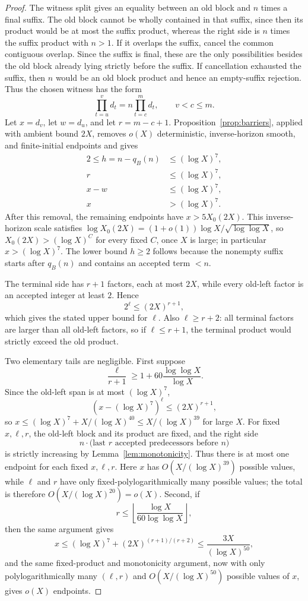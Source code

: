 \documentclass[11pt]{article}
\theoremstyle{definition}
\newcommand{\floor}[1]{\left\lfloor #1\right\rfloor}
\newcommand{\1}{\mathbf 1}
\begin{document}
\begin{proof}
The witness split gives an equality between an old block and \(n\) times a
final suffix.  The old block cannot be wholly contained in that suffix, since
then its product would be at most the suffix product, whereas the right side is
\(n\) times the suffix product with \(n>1\).  If it overlaps the suffix,
cancel the common contiguous overlap.  Since the suffix is final, these are
the only possibilities besides the old block already lying strictly before
the suffix.  If cancellation exhausted the suffix, then \(n\) would be an old
block product and hence an empty-suffix rejection.  Thus the chosen witness has
the form
\[
  \prod_{t=u}^{v} d_t
  = n\prod_{t=c}^{m} d_t,\qquad v<c\le m.
\]
Let \(x=d_v\), let \(w=d_u\), and let \(r=m-c+1\).  Proposition~\ref{prop:barriers},
applied with ambient bound \(2X\), removes \(o(X)\) deterministic,
inverse-horizon smooth, and finite-initial endpoints and gives
\begin{align*}
  2\le h=n-q_B(n)&\le(\log X)^7,\\
  r&\le(\log X)^7,\\
  x-w&\le(\log X)^7,\\
  x&>(\log X)^7.
\end{align*}
After this removal, the remaining endpoints have \(x>5X_0(2X)\).  This
inverse-horizon scale satisfies
\(\log X_0(2X)=(1+o(1))\log X/\sqrt{\log\log X}\), so
\(X_0(2X)>(\log X)^C\) for every fixed \(C\), once \(X\) is large; in
particular \(x>(\log X)^7\).
The lower bound \(h\ge2\) follows because the nonempty suffix starts after
\(q_B(n)\) and contains an accepted term \(<n\).

The terminal side has \(r+1\) factors, each at most \(2X\), while every
old-left factor is an accepted integer at least \(2\).  Hence
\[
  2^\ell\le (2X)^{r+1},
\]
which gives the stated upper bound for \(\ell\).  Also \(\ell\ge r+2\):
all terminal factors are larger than all old-left factors, so if
\(\ell\le r+1\), the terminal product would strictly exceed the old product.

Two elementary tails are negligible.  First suppose
\[
  \frac{\ell}{r+1}\ge 1+60\frac{\log\log X}{\log X}.
\]
Since the old-left span is at most \((\log X)^7\),
\[
  (x-(\log X)^7)^\ell\le(2X)^{r+1},
\]
so \(x\le(\log X)^7+X/(\log X)^{40}\le X/(\log X)^{39}\) for large \(X\).
For fixed \(x,\ell,r\), the
old-left block and its product are fixed, and the right side
\[
  n\cdot\text{(last \(r\) accepted predecessors before \(n\))}
\]
is strictly increasing by Lemma~\ref{lem:monotonicity}.  Thus there is at
most one endpoint for each fixed \(x,\ell,r\).  Here \(x\) has
\(O(X/(\log X)^{39})\) possible values, while \(\ell\) and \(r\) have only
fixed-polylogarithmically many possible values; the total is therefore
\(O(X/(\log X)^{20})=o(X)\).  Second, if
\[
  r\le \floor{\frac{\log X}{60\log\log X}},
\]
then the same argument gives
\[
  x\le(\log X)^7+(2X)^{(r+1)/(r+2)}\le \frac{3X}{(\log X)^{50}},
\]
and the same fixed-product and monotonicity argument, now with only
polylogarithmically many \((\ell,r)\) and \(O(X/(\log X)^{50})\) possible
values of \(x\), gives \(o(X)\) endpoints.


\end{proof}
\end{document}

